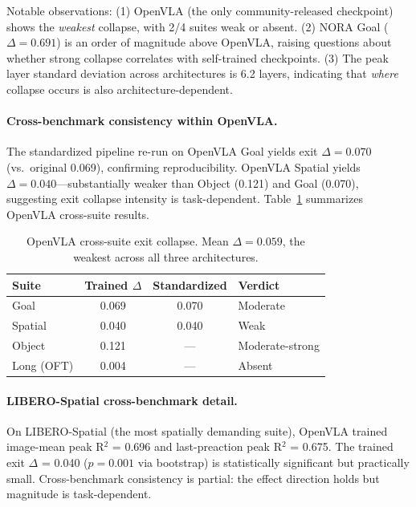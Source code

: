 \documentclass[letterpaper]{article}
\begin{document}
Notable observations:
(1) OpenVLA (the only community-released checkpoint) shows the \emph{weakest} collapse, with 2/4 suites weak or absent.
(2) NORA Goal ($\Delta = 0.691$) is an order of magnitude above OpenVLA, raising questions about whether strong collapse correlates with self-trained checkpoints.
(3) The peak layer standard deviation across architectures is 6.2 layers, indicating that \emph{where} collapse occurs is also architecture-dependent.

\paragraph{Cross-benchmark consistency within OpenVLA.}
The standardized pipeline re-run on OpenVLA Goal yields exit $\Delta = 0.070$ (vs.\ original 0.069), confirming reproducibility.
OpenVLA Spatial yields $\Delta = 0.040$---substantially weaker than Object (0.121) and Goal (0.070), suggesting exit collapse intensity is task-dependent.
Table~\ref{tab:openvla_suites} summarizes OpenVLA cross-suite results.

\begin{table}[t]
\centering
\caption{OpenVLA cross-suite exit collapse. Mean $\Delta = 0.059$, the weakest across all three architectures.}
\label{tab:openvla_suites}
\small
\begin{tabular}{lccl}
\toprule
\textbf{Suite} & \textbf{Trained $\Delta$} & \textbf{Standardized} & \textbf{Verdict} \\
\midrule
Goal & 0.069 & 0.070 & Moderate \\
Spatial & 0.040 & 0.040 & Weak \\
Object & 0.121 & --- & Moderate-strong \\
Long (OFT) & 0.004 & --- & Absent \\
\bottomrule
\end{tabular}
\end{table}

\paragraph{LIBERO-Spatial cross-benchmark detail.}
On LIBERO-Spatial (the most spatially demanding suite), OpenVLA trained image-mean peak R$^2$ = 0.696 and last-preaction peak R$^2$ = 0.675.
The trained exit $\Delta$ = 0.040 ($p = 0.001$ via bootstrap) is statistically significant but practically small.
Cross-benchmark consistency is partial: the effect direction holds but magnitude is task-dependent.
\end{document}
